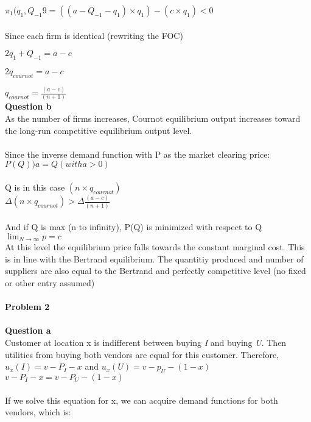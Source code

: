 \documentclass[a4paper, 12pt]{article}
\begin{document}
	$\pi_{1}(q_{1}, Q_{-1}9=((a-Q_{-1}-q_{1})\times q_{1})-(c\times q_{1}) < 0$\\
	\\
	Since each firm is identical (rewriting the FOC)
	
	$2q_{1} + Q_{-1} = a-c$	
	
	$2q_{cournot}=a-c$	
	
	$q_{cournot}=\frac {(a-c)}{(n+1)}$
	\\
	
	\textbf{Question b}\\
	
	As the number of firms increases, Cournot equilibrium output increases toward the long-run competitive equilibrium output level.\\
	\\
	Since the inverse demand function with P as the market clearing price:\\
	
	$P(Q))a=Q (with a>0)$\\
	\\
	Q is in this case $(n\times q_{cournot})$\\
	
	$\Delta(n\times q_{cournot})>\Delta \frac {(a-c)}{(n+1)}$\\
	\\
	And if Q is max (n to infinity), P(Q) is minimized with respect to Q\\
	
	$\lim_{N\to \infty} p=c$\\
	
	At this level the equilibrium price falls towards the constant marginal cost. This is in line with the Bertrand equilibrium. The quantitiy produced and number of suppliers are also equal to the Bertrand and perfectly competitive level (no fixed or other entry assumed)\\
	\\
	\textbf{Problem 2}\\
	\\
	\textbf{Question a}\\
	
	Customer at location x is indifferent between buying \textit{I} and buying \textit{U}. Then utilities from buying both vendors are equal for this customer. Therefore,\\
	
	$ u_{x}(I)=v-P_{I}-x$ and $u_{x}(U)=v-p_{U}-(1-x)$\\
	
	$v-P_{I}-x=v-P_{U}-(1-x)$\\
	\\
	If we solve this equation for x, we can acquire demand functions for both vendors, which is:\\
	
\end{document}
